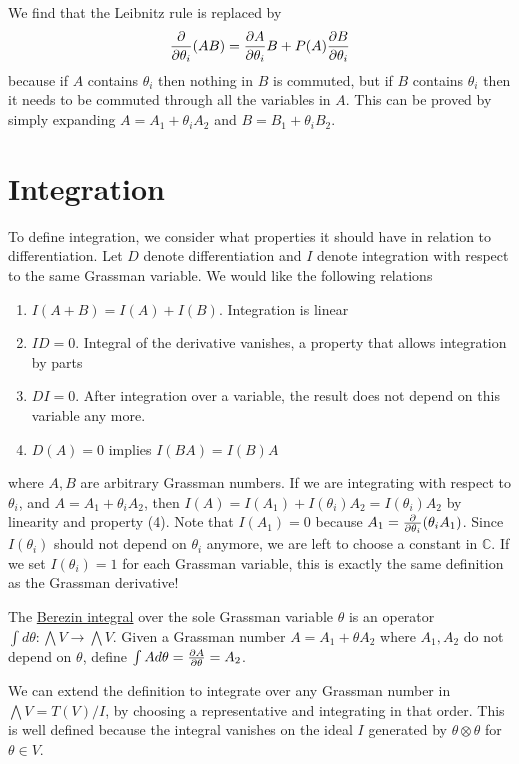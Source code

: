We find that the Leibnitz rule is replaced by
 \[
\pdv{}{\theta_i}(AB) = \pdv{A}{\theta_i}B + P(A) \pdv{B}{\theta_i} 
\] 
because if $A$ contains  $\theta_i$ then nothing in $B$ is commuted, but if
$B$ contains  $\theta_i$ then it needs to be commuted through all the variables
in $A$. This can be proved by simply expanding $A = A_1+\theta_iA_2$
and $B=B_1+\theta_iB_2$.

\section{Integration}
To define integration, we consider what properties it should have in relation to
differentiation. Let $D$ denote differentiation and  $I$ denote integration with
respect to the same Grassman variable. We would like the following relations
\begin{enumerate}[(1)]
	\item $I(A+B) = I(A)+I(B)$. Integration is linear 
    \item $ID = 0$. Integral of the derivative vanishes, a property that
		allows integration by parts
	 \item $DI = 0$. After integration over a variable, the result does not
		 depend on this variable any more.
	\item $D(A) = 0$ implies  $I(BA) = I(B)A$
\end{enumerate}
where $A,B$ are arbitrary Grassman numbers. If we are integrating with respect
to $\theta_i$,  and $A=A_1+\theta_iA_2$, then $I(A)=I(A_1)+I(\theta_i)A_2 =
I(\theta_i)A_2$ by linearity and property (4). Note that $I(A_1)=0$ because $A_1
= \pdv{}{\theta_i} (\theta_iA_1)$. Since $I(\theta_i)$ should not depend on
$\theta_i$ anymore, we are left to choose a constant in  $\mathbb{C}$.
If we set $I(\theta_i)=1$ for each Grassman variable, this is exactly the same
definition as the Grassman derivative!

\begin{defn}
	The \underline{Berezin integral} over the sole Grassman variable $\theta$ is
	an operator $\int d\theta : \bigwedge V \to \bigwedge V$. Given a Grassman
	number $A=A_1+\theta A_2$ where  $A_1,A_2$ do not depend on  $\theta$, define
	$\int A d\theta = \pdv{A}{\theta} = A_2$.
\end{defn}

We can extend the definition to integrate over any Grassman number in 
$\bigwedge V = T(V) /I$, by 
choosing a representative and integrating in that order. This is well defined
because the integral vanishes on the ideal $I$ generated by $\theta\otimes
\theta$ for $\theta\in V$. 
 
